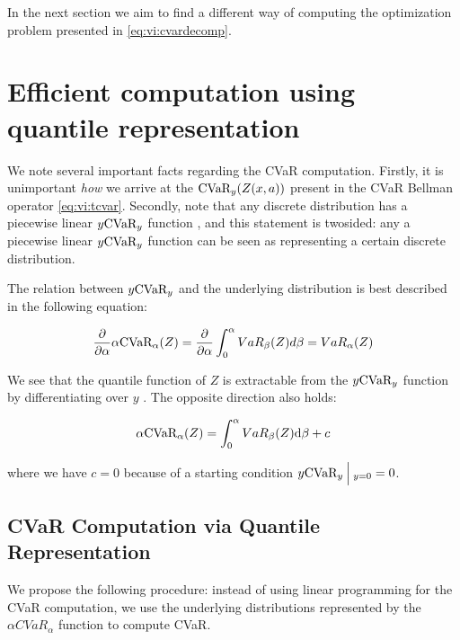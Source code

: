 
In the next section we aim to find a different way of computing the optimization problem presented in \ref{eq:vi:cvardecomp}.



\section{Efficient computation using quantile representation}\label{sec:vi:linear}

We note several important facts regarding the CVaR computation. Firstly, it is unimportant \emph{how} we arrive at the $\cvar_y(Z(x, a))$ present in the CVaR Bellman operator \ref{eq:vi:tcvar}. Secondly, note that any discrete distribution has a piecewise linear $y\cvar_y$ function \cite{rockafellar2002conditional}, and this statement is twosided: any a piecewise linear $y\cvar_y$ function can be seen as representing a certain discrete distribution.

The relation between $y\cvar_y$ and the underlying distribution is best described in the following equation:

\begin{equation}\label{eq:vi:varcvarderivation}
\dfrac{\partial}{\partial \alpha} \alpha \cvar_\alpha(Z) = \dfrac{\partial}{\partial \alpha} \int_0^\alpha VaR_\beta(Z) d\beta = VaR_\alpha(Z)
\end{equation}

We see that the quantile function of $Z$ is extractable from the $y\cvar_y$ function by differentiating over $y$ . The opposite direction also holds:

\begin{equation}\label{eq:vi:varcvarintegration}
\alpha \cvar_\alpha(Z) = \int_0^\alpha VaR_\beta(Z) \dt \beta + c
\end{equation}

where we have $c=0$ because of a starting condition $y \cvar_y \given[\Big]_{y=0}=0$.

\subsection{CVaR Computation via Quantile Representation}

We propose the following procedure: instead of using linear programming for the CVaR computation, we use the underlying distributions represented by the $\alpha CVaR_\alpha$ function to compute CVaR.

